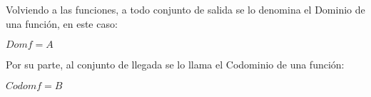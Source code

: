\documentclass[Análisis.root.tex]{subfiles}
\begin{document}
        Volviendo a las funciones, a todo conjunto de salida se lo denomina el Dominio de una función, en este caso:
        \begin{center}
            \(Dom f = A\)
        \end{center}
        Por su parte, al conjunto de llegada se lo llama el Codominio de una función:
        \begin{center}
            \(Codom f = B\)
        \end{center}
\end{document}
